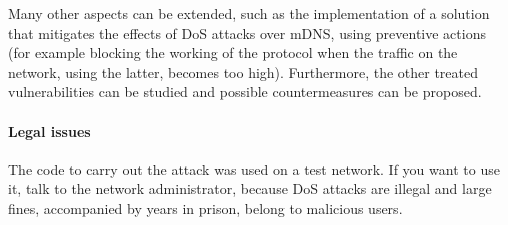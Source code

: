\documentclass[fleqn, 11pt]{SelfArx} %
\begin{document}
Many other aspects can be extended, such as the implementation of a solution that mitigates the effects of DoS attacks over mDNS, using preventive actions 
(for example blocking the working of the protocol when the traffic on the network, using the latter, becomes too high).
Furthermore, the other treated vulnerabilities can be studied and possible countermeasures can be proposed.

\paragraph{Legal issues \cite{IllegalIssues}} The code to carry out the attack was used on a test network. If you want to use it, talk to the network administrator, because DoS attacks are illegal and large fines, accompanied by years in prison, belong to malicious users.

\clearpage
{}



\end{document}
